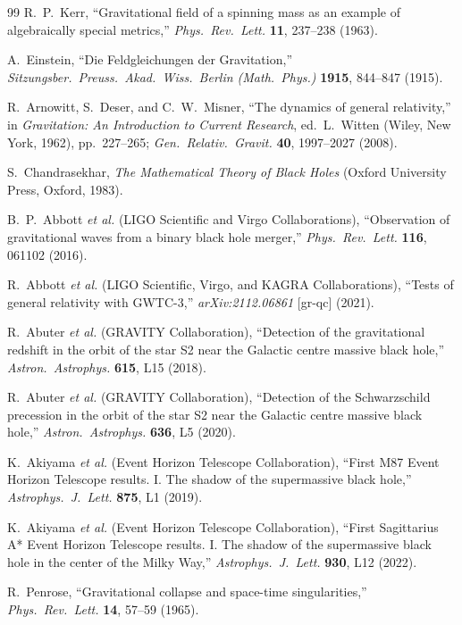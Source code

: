 \documentclass[11pt,a4paper]{article}
\theoremstyle{plain}
\theoremstyle{definition}
\theoremstyle{remark}
\numberwithin{equation}{section}
\begin{document}
\begin{thebibliography}{99}
R.~P.~Kerr, ``Gravitational field of a spinning mass as an example of algebraically special metrics,'' \textit{Phys.\ Rev.\ Lett.} \textbf{11}, 237--238 (1963).

A.~Einstein, ``Die Feldgleichungen der Gravitation,'' \textit{Sitzungsber.\ Preuss.\ Akad.\ Wiss.\ Berlin (Math.\ Phys.)} \textbf{1915}, 844--847 (1915).

R.~Arnowitt, S.~Deser, and C.~W.~Misner, ``The dynamics of general relativity,'' in \textit{Gravitation: An Introduction to Current Research}, ed.\ L.~Witten (Wiley, New York, 1962), pp.~227--265; \textit{Gen.\ Relativ.\ Gravit.} \textbf{40}, 1997--2027 (2008).

S.~Chandrasekhar, \textit{The Mathematical Theory of Black Holes} (Oxford University Press, Oxford, 1983).

B.~P.~Abbott \textit{et al.} (LIGO Scientific and Virgo Collaborations), ``Observation of gravitational waves from a binary black hole merger,'' \textit{Phys.\ Rev.\ Lett.} \textbf{116}, 061102 (2016).

R.~Abbott \textit{et al.} (LIGO Scientific, Virgo, and KAGRA Collaborations), ``Tests of general relativity with GWTC-3,'' \textit{arXiv:2112.06861} [gr-qc] (2021).

R.~Abuter \textit{et al.} (GRAVITY Collaboration), ``Detection of the gravitational redshift in the orbit of the star S2 near the Galactic centre massive black hole,'' \textit{Astron.\ Astrophys.} \textbf{615}, L15 (2018).

R.~Abuter \textit{et al.} (GRAVITY Collaboration), ``Detection of the Schwarzschild precession in the orbit of the star S2 near the Galactic centre massive black hole,'' \textit{Astron.\ Astrophys.} \textbf{636}, L5 (2020).

K.~Akiyama \textit{et al.} (Event Horizon Telescope Collaboration), ``First M87 Event Horizon Telescope results. I. The shadow of the supermassive black hole,'' \textit{Astrophys.\ J.\ Lett.} \textbf{875}, L1 (2019).

K.~Akiyama \textit{et al.} (Event Horizon Telescope Collaboration), ``First Sagittarius A* Event Horizon Telescope results. I. The shadow of the supermassive black hole in the center of the Milky Way,'' \textit{Astrophys.\ J.\ Lett.} \textbf{930}, L12 (2022).

R.~Penrose, ``Gravitational collapse and space-time singularities,'' \textit{Phys.\ Rev.\ Lett.} \textbf{14}, 57--59 (1965).


\end{thebibliography}
\end{document}
